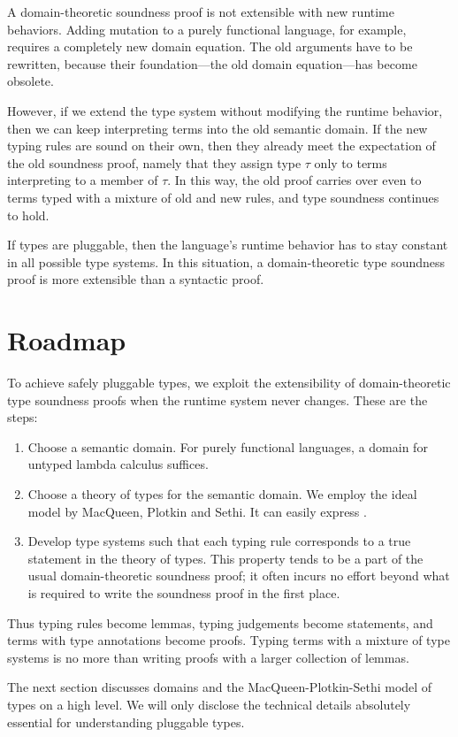 \documentclass{amsart}
\begin{document}
A domain-theoretic soundness proof is not extensible with new
runtime behaviors. Adding mutation to a purely functional
language, for example, requires a completely new domain equation.
The old arguments have to be rewritten, because their
foundation---the old domain equation---has become obsolete.

However, if we extend the type system without modifying the
runtime behavior, then we can keep interpreting terms into the
old semantic domain. If the new typing rules are sound on their
own, then they already meet the expectation of the old soundness
proof, namely that they assign type $\tau$ only to terms
interpreting to a member of $\tau$. In this way, the old proof
carries over even to terms typed with a mixture of old and new
rules, and type soundness continues to hold.

If types are pluggable, then the language's runtime behavior has
to stay constant in all possible type systems. In this situation,
a domain-theoretic type soundness proof is more extensible than a
syntactic proof.


\section{Roadmap}

To achieve safely pluggable types, we exploit the extensibility
of domain-theoretic type soundness proofs when the runtime system
never changes. These are the steps:
\begin{enumerate}
\item Choose a semantic domain. For purely functional languages,
a domain for untyped lambda calculus suffices.
\item Choose a theory of types for the semantic domain. We employ
the ideal model by MacQueen, Plotkin and Sethi. It can easily
express \thingsExpressibleInMpsModel.
\item Develop type systems such that each typing rule corresponds
to a true statement in the theory of types. This property tends
to be a part of the usual domain-theoretic soundness proof; it
often incurs no effort beyond what is required to write the
soundness proof in the first place.
\end{enumerate}
Thus typing rules become lemmas, typing judgements become
statements, and terms with type annotations become proofs. Typing
terms with a mixture of type systems is no more than writing
proofs with a larger collection of lemmas.

The next section discusses domains and the MacQueen-Plotkin-Sethi
model of types on a high level. We will only disclose the
technical details absolutely essential for understanding
pluggable types.
\end{document}
